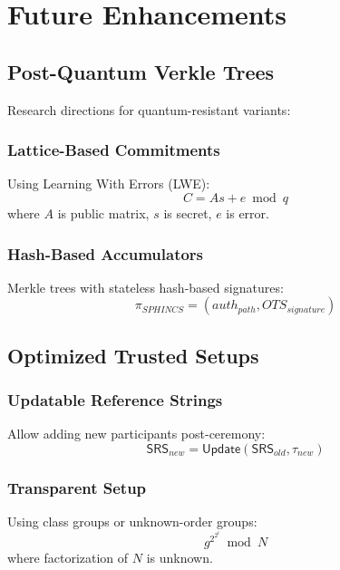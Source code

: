 \section{Future Enhancements}


\subsection{Post-Quantum Verkle Trees}

Research directions for quantum-resistant variants:

\subsubsection{Lattice-Based Commitments}
Using Learning With Errors (LWE):
\begin{equation}
    C = As + e \bmod q
\end{equation}
where $A$ is public matrix, $s$ is secret, $e$ is error.

\subsubsection{Hash-Based Accumulators}
Merkle trees with stateless hash-based signatures:
\begin{equation}
    \pi_{SPHINCS} = (auth_{path}, OTS_{signature})
\end{equation}

\subsection{Optimized Trusted Setups}

\subsubsection{Updatable Reference Strings}
Allow adding new participants post-ceremony:
\begin{equation}
    \mathsf{SRS}_{new} = \mathsf{Update}(\mathsf{SRS}_{old}, \tau_{new})
\end{equation}

\subsubsection{Transparent Setup}
Using class groups or unknown-order groups:
\begin{equation}
    g^{2^{2^t}} \bmod N
\end{equation}
where factorization of $N$ is unknown.

